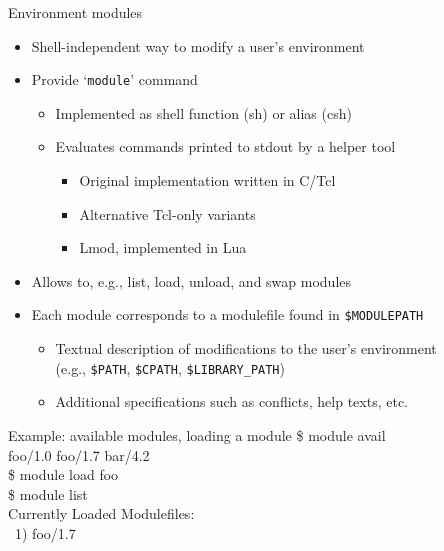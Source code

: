 \documentclass[10pt,xcolor={usenames,dvipsnames}]{beamer}
\begin{document}
\begin{frame}{Environment modules}
\begin{itemize}
    \item
        Shell-independent way to modify a user's environment
    \item
        Provide `\texttt{module}' command
        \begin{itemize}
            \item
                Implemented as shell function (sh) or alias (csh)
            \item
                Evaluates commands printed to stdout by a helper tool
                \begin{itemize}
                    \item
                        Original implementation written in C/Tcl
                    \item
                        Alternative Tcl-only variants
                    \item
                        Lmod, implemented in Lua
                \end{itemize}
        \end{itemize}
    \item
        Allows to, e.g., list, load, unload, and swap modules
    \item
        Each module corresponds to a modulefile found in \texttt{\$MODULEPATH}
        \begin{itemize}
            \item
                Textual description of modifications to the user's environment\\
                (e.g., \texttt{\$PATH}, \texttt{\$CPATH},
                \texttt{\$LIBRARY\_PATH})
            \item
                Additional specifications such as conflicts, help texts, etc.
        \end{itemize}
\end{itemize}
\vspace*{-5pt}
\begin{center}
    \begin{minipage}{0.9\textwidth}
        \begin{exampleblock}{Example: available modules, loading a module}
            \ttfamily\small{
            \$ module avail\\
            foo/1.0 \enskip foo/1.7 \enskip bar/4.2\\
            \$ module load foo\\
            \$ module list\\
            Currently Loaded Modulefiles:\\
            ~1) foo/1.7}
        \end{exampleblock}
    \end{minipage}
\end{center}
\end{frame}
\end{document}
